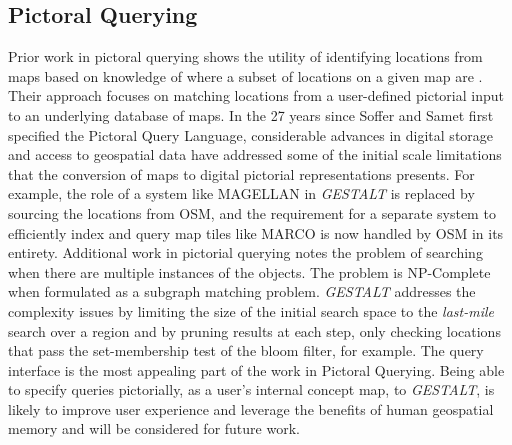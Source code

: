\subsection{Pictoral Querying}
Prior work in pictoral querying shows the utility of identifying locations from maps based on knowledge of where a subset of locations on a given map are \cite{Soffer1997}. 
Their approach focuses on matching locations from a user-defined pictorial input to an underlying database of maps. In the 27 years since Soffer and Samet first specified the Pictoral Query Language, considerable advances in digital storage and access to geospatial data have addressed some of the initial scale limitations that the conversion of maps to digital pictorial representations presents. For example, the role of a system like MAGELLAN \cite{Samet1998} in \textit{GESTALT} is replaced by sourcing the locations from OSM, and the requirement for a separate system to efficiently index and query map tiles like MARCO \cite{Samet1996} is now handled by OSM in its entirety. 
Additional work in pictorial querying notes the problem of searching when there are multiple instances of the objects. The problem is NP-Complete when formulated as a subgraph matching problem\cite{Folkers2000}. 
\textit{GESTALT} addresses the complexity issues by limiting the size of the initial search space to the \textit{last-mile} search over a region and by pruning results at each step, only checking locations that pass the set-membership test of the bloom filter, for example. 
The query interface is the most appealing part of the work in Pictoral Querying. Being able to specify queries pictorially, as a user's internal concept map, to \textit{GESTALT}, is likely to improve user experience and leverage the benefits of human geospatial memory and will be considered for future work. 
